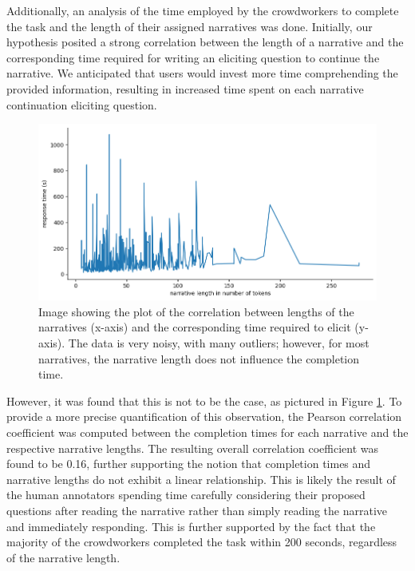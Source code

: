 Additionally, an analysis of the time employed by the crowdworkers to complete the task and the length of their assigned narratives was done. Initially, our hypothesis posited a strong correlation between the length of a narrative and the corresponding time required for writing an eliciting question to continue the narrative. We anticipated that users would invest more time comprehending the provided information, resulting in increased time spent on each narrative continuation eliciting question.
\begin{figure}[!htbp]
    \centering
    \includegraphics[width=1\linewidth]{assets//imgs/dataset-pearson-correlation.png}
    \caption{Image showing the plot of the correlation between lengths of the narratives (x-axis) and the corresponding time required to elicit (y-axis). The data is very noisy, with many outliers; however, for most narratives, the narrative length does not influence the completion time.}
    \label{fig:dataset-pearson-correlation}
\end{figure}
However, it was found that this is not to be the case, as pictured in Figure \ref{fig:dataset-pearson-correlation}. To provide a more precise quantification of this observation, the Pearson correlation coefficient \cite{pearson} was computed between the completion times for each narrative and the respective narrative lengths. The resulting overall correlation coefficient was found to be 0.16, further supporting the notion that completion times and narrative lengths do not exhibit a linear relationship. This is likely the result of the human annotators spending time carefully considering their proposed questions after reading the narrative rather than simply reading the narrative and immediately responding. This is further supported by the fact that the majority of the crowdworkers completed the task within 200 seconds, regardless of the narrative length.

